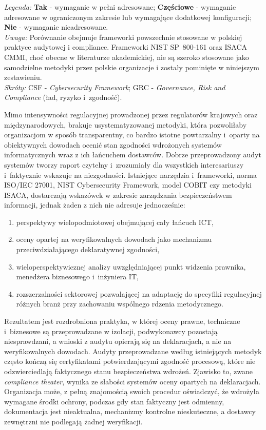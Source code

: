 \begin{flushleft}
\footnotesize
\textit{Legenda:} \textbf{Tak} - wymaganie w pełni adresowane; 
\textbf{Częściowe} - wymaganie adresowane w ograniczonym zakresie lub wymagające dodatkowej konfiguracji; 
\textbf{Nie} - wymaganie nieadresowane.\\
\textit{Uwaga:} Porównanie obejmuje frameworki powszechnie stosowane w polskiej praktyce audytowej 
i compliance. Frameworki NIST SP~800-161 oraz ISACA CMMI, choć obecne w literaturze akademickiej, 
nie są szeroko stosowane jako samodzielne metodyki przez polskie organizacje 
i zostały pominięte w niniejszym zestawieniu.\\
\textit{Skróty:} CSF - \textit{Cybersecurity Framework}; 
GRC - \textit{Governance, Risk and Compliance} (ład, ryzyko i~zgodność).

\end{flushleft}



Mimo intensywności regulacyjnej prowadzonej przez regulatorów krajowych oraz międzynarodowych, brakuje usystematyzowanej metodyki, która pozwoliłaby organizacjom w sposób transparentny, co bardzo istotne powtarzalny i~oparty na obiektywnych dowodach ocenić  stan zgodności wdrożonych systemów informatycznych wraz z ich łańcuchem dostawców. Dobrze przeprowadzony audyt systemów tworzy raport czytelny i~zrozumiały dla wszystkich interesariuszy i~faktycznie wskazuje na niezgodności.
Istniejące narzędzia i~frameworki, norma ISO/IEC 27001,  NIST Cybersecurity Framework, model COBIT czy metodyki ISACA, dostarczają  wskazówek w zakresie zarządzania bezpieczeństwem informacji, jednak żaden z nich nie adresuje jednocześnie: 
\begin{enumerate}[label=(\roman*)]
  \item perspektywy wielopodmiotowej obejmującej cały łańcuch ICT, 
  \item oceny opartej na weryfikowalnych dowodach jako mechanizmu przeciwdziałającego deklaratywnej zgodności,
  \item wieloperspektywicznej analizy uwzględniającej punkt widzenia prawnika, menedżera biznesowego i~inżyniera IT, \item rozszerzalności sektorowej pozwalającej na adaptację do specyfiki regulacyjnej różnych branż przy zachowaniu wspólnego rdzenia metodycznego.
\end{enumerate}

Rezultatem jest rozdrobniona praktyka, w której oceny prawne, techniczne i~biznesowe są przeprowadzane w izolacji, podwykonawcy pozostają niesprawdzani, a wnioski z audytu opierają się na deklaracjach, a nie na weryfikowalnych dowodach.
Audyty przeprowadzane według istniejących metodyk często kończą się certyfikatami potwierdzającymi zgodność procesową, które nie odzwierciedlają faktycznego stanu bezpieczeństwa wdrożeń. Zjawisko to, zwane  \textit{compliance theater}, wynika ze słabości systemów oceny opartych na deklaracjach.  Organizacja może, z pełną znajomością swoich procedur oświadczyć, że wdrożyła wymagane środki ochrony, podczas gdy stan faktyczny jest odmienny, dokumentacja jest nieaktualna, mechanizmy kontrolne nieskuteczne, a dostawcy zewnętrzni nie podlegają żadnej weryfikacji.

